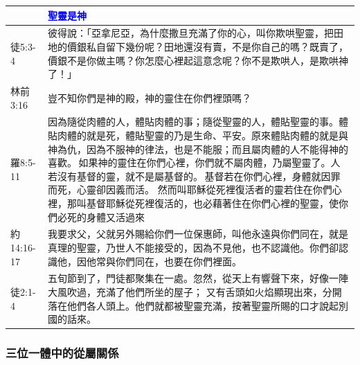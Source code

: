 \begin{table}[H]
\begin{tabular}{p{5.6em}p{43em}}
&\textcolor{blue}{聖靈是神}\\  \midrule
徒5:3-4&彼得說：「亞拿尼亞，為什麼撒旦充滿了你的心，叫你欺哄聖靈，把田地的價銀私自留下幾份呢？田地還沒有賣，不是你自己的嗎？既賣了，價銀不是你做主嗎？你怎麼心裡起這意念呢？你不是欺哄人，是欺哄神了！」\\  \midrule
林前3:16&豈不知你們是神的殿，神的靈住在你們裡頭嗎？ \\  \midrule
羅8:5-11&因為隨從肉體的人，體貼肉體的事；隨從聖靈的人，體貼聖靈的事。體貼肉體的就是死，體貼聖靈的乃是生命、平安。原來體貼肉體的就是與神為仇，因為不服神的律法，也是不能服；而且屬肉體的人不能得神的喜歡。 如果神的靈住在你們心裡，你們就不屬肉體，乃屬聖靈了。人若沒有基督的靈，就不是屬基督的。 基督若在你們心裡，身體就因罪而死，心靈卻因義而活。 然而叫耶穌從死裡復活者的靈若住在你們心裡，那叫基督耶穌從死裡復活的，也必藉著住在你們心裡的聖靈，使你們必死的身體又活過來\\  \midrule
約14:16-17&我要求父，父就另外賜給你們一位保惠師，叫他永遠與你們同在，就是真理的聖靈，乃世人不能接受的，因為不見他，也不認識他。你們卻認識他，因他常與你們同在，也要在你們裡面。\\  \midrule
徒2:1-4&五旬節到了，門徒都聚集在一處。忽然，從天上有響聲下來，好像一陣大風吹過，充滿了他們所坐的屋子； 又有舌頭如火焰顯現出來，分開落在他們各人頭上。他們就都被聖靈充滿，按著聖靈所賜的口才說起別國的話來。\\  \midrule
\bottomrule
\end{tabular}%
\end{table}

\subsubsection{三位一體中的從屬關係}


